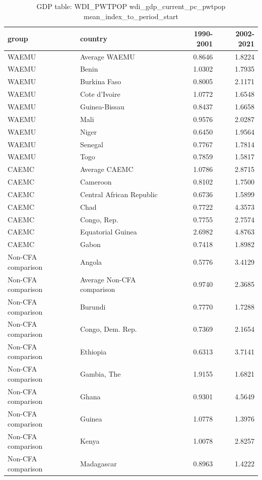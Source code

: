 \begin{table}

\caption{GDP table: WDI_PWTPOP wdi_gdp_current_pc_pwtpop mean_index_to_period_start}
\centering
\begin{tabular}[t]{llrr}
\toprule
group & country & 1990-2001 & 2002-2021\\
\midrule
WAEMU & Average WAEMU & 0.8646 & 1.8224\\
WAEMU & Benin & 1.0302 & 1.7935\\
WAEMU & Burkina Faso & 0.8005 & 2.1171\\
WAEMU & Cote d'Ivoire & 1.0772 & 1.6548\\
WAEMU & Guinea-Bissau & 0.8437 & 1.6658\\
\addlinespace
WAEMU & Mali & 0.9576 & 2.0287\\
WAEMU & Niger & 0.6450 & 1.9564\\
WAEMU & Senegal & 0.7767 & 1.7814\\
WAEMU & Togo & 0.7859 & 1.5817\\
CAEMC & Average CAEMC & 1.0786 & 2.8715\\
\addlinespace
CAEMC & Cameroon & 0.8102 & 1.7500\\
CAEMC & Central African Republic & 0.6736 & 1.5899\\
CAEMC & Chad & 0.7722 & 4.3573\\
CAEMC & Congo, Rep. & 0.7755 & 2.7574\\
CAEMC & Equatorial Guinea & 2.6982 & 4.8763\\
\addlinespace
CAEMC & Gabon & 0.7418 & 1.8982\\
Non-CFA comparison & Angola & 0.5776 & 3.4129\\
Non-CFA comparison & Average Non-CFA comparison & 0.9740 & 2.3685\\
Non-CFA comparison & Burundi & 0.7770 & 1.7288\\
Non-CFA comparison & Congo, Dem. Rep. & 0.7369 & 2.1654\\
\addlinespace
Non-CFA comparison & Ethiopia & 0.6313 & 3.7141\\
Non-CFA comparison & Gambia, The & 1.9155 & 1.6821\\
Non-CFA comparison & Ghana & 0.9301 & 4.5649\\
Non-CFA comparison & Guinea & 1.0778 & 1.3976\\
Non-CFA comparison & Kenya & 1.0078 & 2.8257\\
\addlinespace
Non-CFA comparison & Madagascar & 0.8963 & 1.4222\\

\end{tabular}
\end{table}
